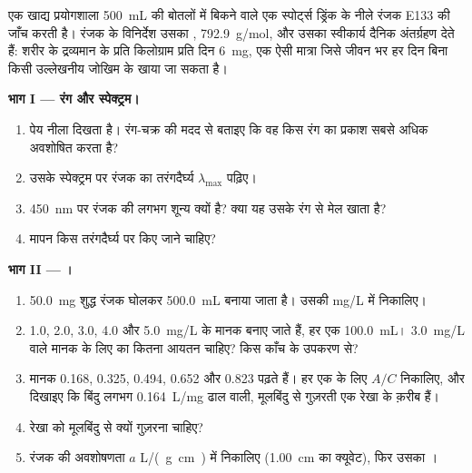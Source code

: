 \begin{problem}
\label{pb:g11:absorbance:1}
एक खाद्य प्रयोगशाला \qty{500}{mL} की बोतलों में बिकने वाले एक स्पोर्ट्स ड्रिंक के नीले
रंजक E133 की जाँच करती है। रंजक के विनिर्देश उसका ,
\qty{792.9}{g/mol}, और उसका स्वीकार्य दैनिक अंतर्ग्रहण देते हैं: शरीर के द्रव्यमान के
प्रति किलोग्राम प्रति दिन \qty{6}{mg}, एक ऐसी मात्रा जिसे जीवन भर हर दिन बिना किसी
उल्लेखनीय जोखिम के खाया जा सकता है।

\medskip
\noindent\textbf{भाग I --- रंग और स्पेक्ट्रम।}
\begin{enumerate}
  \item पेय नीला दिखता है। रंग-चक्र की मदद से बताइए कि वह किस रंग का
        प्रकाश सबसे अधिक अवशोषित करता है?
  \item उसके स्पेक्ट्रम पर रंजक का तरंगदैर्घ्य $\lambda_{\max}$ पढ़िए।
  \item \qty{450}{nm} पर रंजक की  लगभग शून्य क्यों है?
        क्या यह उसके रंग से मेल खाता है?
  \item मापन किस तरंगदैर्घ्य पर किए जाने चाहिए?
\end{enumerate}

\medskip
\noindent\textbf{भाग II --- ।}
\begin{enumerate}[resume]
  \item \qty{50.0}{mg} शुद्ध रंजक घोलकर \qty{500.0}{mL}
         बनाया जाता है। उसकी  \si{mg/L} में निकालिए।
  \item 1.0, 2.0, 3.0, 4.0 और \qty{5.0}{mg/L} के मानक बनाए जाते हैं,
        हर एक \qty{100.0}{mL}। \qty{3.0}{mg/L} वाले मानक के लिए  का कितना
        आयतन चाहिए? किस काँच के उपकरण से?
  \item मानक 0.168, 0.325, 0.494, 0.652 और 0.823 पढ़ते हैं। हर एक के लिए
        $A / C$ निकालिए, और दिखाइए कि बिंदु लगभग \qty{0.164}{L/mg} ढाल वाली,
        मूलबिंदु से गुज़रती एक रेखा के क़रीब हैं।
  \item रेखा को मूलबिंदु से क्यों गुज़रना चाहिए?
  \item रंजक की अवशोषणता $a$ \si{L/(g.cm)} में निकालिए (\qty{1.00}{cm} का
        क्यूवेट), फिर उसका ।
\end{enumerate}


\end{problem}
